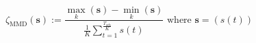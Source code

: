 \begin{equation}
	\zeta_\text{MMD}(\textbf{s}) := \frac{\max_k \left(\textbf{s}\right) - \min_k\left(\textbf{s}\right)}{\frac{1}{K}\sum_{t=1}^{\frac{T_\text{sch}}{K}}s(t)}
	\text{ where } \textbf{s} = (s(t))
\label{ch1:equ:min-max-difference-definition}
\end{equation}